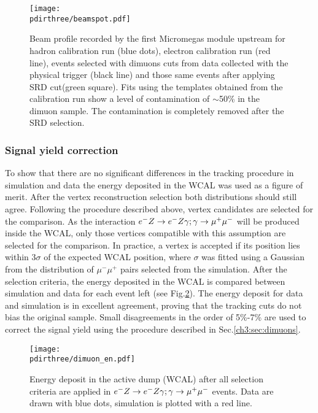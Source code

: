 \begin{figure}[tbh!]
  \centering
    \texttt{[image: \\pdirthree/beamspot.pdf]}
  \caption[Beam profile with different cuts]{Beam profile recorded by the first Micromegas module upstream for hadron calibration run (blue dots), electron calibration run (red line), events selected with dimuons cuts from data collected with the physical trigger (black line) and those same events after applying SRD cut(green square). Fits using the templates obtained from the calibration run show a level of contamination of $\sim$50\% in the dimuon sample. The contamination is completely removed after the SRD selection.}
  \label{fig:dimuon:profile}
\end{figure}

\subsubsection{Signal yield correction}
\label{ch3:sec:dimuons-sig-corr}

To show that there are no significant differences in the tracking procedure in simulation and data the energy deposited in the WCAL was used as a figure of merit. After the vertex reconstruction selection both distributions should still agree.
Following the procedure described above, vertex candidates are selected for the comparison. As the interaction $\emu$ will be produced inside the WCAL, only those vertices compatible with this assumption are selected for the comparison. In practice, a vertex is accepted if its position lies within 3$\sigma$ of the expected WCAL position, where $\sigma$ was fitted using a Gaussian from the distribution of $\mu^- \mu^+$ pairs selected from the simulation. After the selection criteria, the energy deposited in the WCAL is compared between simulation and data for each event left (see Fig.\ref{fig:dimuon_en}). The energy deposit for data and simulation is in excellent agreement, proving that the tracking cuts do not bias the original sample. Small disagreements in the order of 5\%-7\% are used to correct the signal yield using the procedure described in Sec.\ref{ch3:sec:dimuons}.

\begin{figure}[tbh!]
  \centering
    \texttt{[image: \\pdirthree/dimuon\_en.pdf]}
  \caption[$\emu$ MC-DATA comparison in visible mode]{Energy deposit in the active dump (WCAL) after all selection criteria are applied in $\emu$ events. Data are drawn with blue dots, simulation is plotted with a red line.}
  \label{fig:dimuon_en}
\end{figure}

